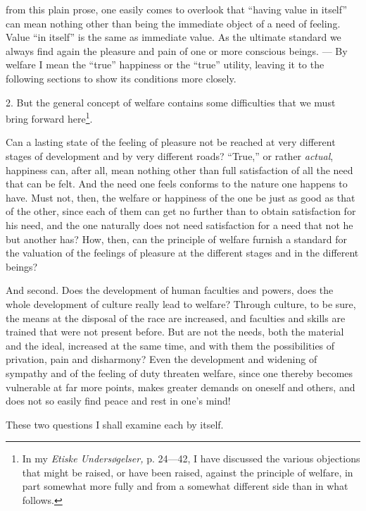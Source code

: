 \documentclass[12pt,a4paper,openany]{book}
\newcommand{\opage}[1]{\marginnote{\footnotesize\textit{[#1]}}}
\begin{document}
\opage{139}from this plain prose, one easily comes to overlook that ``having value in itself'' can mean nothing
other than being the immediate object of a need of feeling. Value ``in itself'' is the same as immediate
value. As the ultimate standard we always find again the pleasure and pain of one or more conscious
beings. --- By welfare I mean the ``true'' happiness or the ``true'' utility, leaving it to the following
sections to show its conditions more closely.

2. But the general concept of welfare contains some difficulties that we must bring forward
here\footnote[1]{In my \textit{Etiske Undersøgelser,} p. 24---42, I have discussed the various objections
that might be raised, or have been raised, against the principle of welfare, in part somewhat more fully
and from a somewhat different side than in what follows.}.

Can a lasting state of the feeling of pleasure not be reached at very different stages of development and
by very different roads? ``True,'' or rather \textit{actual}, happiness can, after all, mean nothing other
than full satisfaction of all the need that can be felt. And the need one feels conforms to the nature one
happens to have. Must not, then, the welfare or happiness of the one be just as good as that of the other,
since each of them can get no further than to obtain satisfaction for his need, and the one naturally
does not need satisfaction for a need that not he but another has? How, then, can the principle of welfare
furnish a standard for the valuation of the feelings of pleasure at the different stages and in the
different beings?

And second. Does the development of human faculties and powers, does the whole development of culture
really lead to
\opage{140}welfare? Through culture, to be sure, the means at the disposal of the race are increased, and faculties
and skills are trained that were not present before. But are not the needs, both the material and the
ideal, increased at the same time, and with them the possibilities of privation, pain and disharmony? Even
the development and widening of sympathy and of the feeling of duty threaten welfare, since one thereby
becomes vulnerable at far more points, makes greater demands on oneself and others, and does not so easily
find peace and rest in one's mind!

These two questions I shall examine each by itself.
\end{document}
